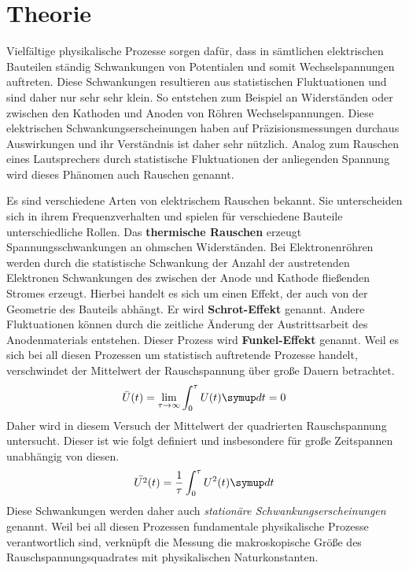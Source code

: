 \section{Theorie}
\label{sec:theorie}

Vielfältige physikalische Prozesse sorgen dafür, dass in sämtlichen elektrischen Bauteilen ständig Schwankungen von Potentialen und somit Wechselspannungen auftreten. Diese Schwankungen resultieren aus statistischen Fluktuationen und sind daher nur sehr sehr klein. So entstehen zum Beispiel an Widerständen oder zwischen den Kathoden und Anoden von Röhren Wechselspannungen. Diese elektrischen Schwankungserscheinungen haben auf Präzisionsmessungen durchaus Auswirkungen und ihr Verständnis ist daher sehr nützlich. Analog zum Rauschen eines Lautsprechers durch statistische Fluktuationen der anliegenden Spannung wird dieses Phänomen auch Rauschen genannt.

Es sind verschiedene Arten von elektrischem Rauschen bekannt. Sie unterscheiden sich in ihrem Frequenzverhalten und spielen für verschiedene Bauteile unterschiedliche Rollen. Das \textbf{thermische Rauschen} erzeugt Spannungsschwankungen an ohmschen Widerständen. Bei Elektronenröhren werden durch die statistische Schwankung der Anzahl der austretenden Elektronen Schwankungen des zwischen der Anode und Kathode fließenden Stromes erzeugt. Hierbei handelt es sich um einen Effekt, der auch von der Geometrie des Bauteils abhängt. Er wird \textbf{Schrot-Effekt} genannt. Andere Fluktuationen können durch die zeitliche Änderung der Austrittsarbeit des Anodenmaterials entstehen. Dieser Prozess wird \textbf{Funkel-Effekt} genannt. Weil es sich bei all diesen Prozessen um statistisch auftretende Prozesse handelt, verschwindet der Mittelwert der Rauschspannung über große Dauern betrachtet.
%
\begin{equation}
  \bar{U}(t)=\lim_{\tau\rightarrow\infty}\int_0^\tau U(t)\upd t=0
\end{equation}
%
Daher wird in diesem Versuch der Mittelwert der quadrierten Rauschspannung untersucht. Dieser ist wie folgt definiert und insbesondere für große Zeitspannen unabhängig von diesen.
%
\begin{equation}
  \bar{U^2}(t) =\frac{1}{\tau}\int_0^\tau U^2(t) \upd t
\end{equation}
%
Diese Schwankungen werden daher auch \textit{stationäre Schwankungserscheinungen} genannt. Weil bei all diesen Prozessen fundamentale physikalische Prozesse verantwortlich sind, verknüpft die Messung die makroskopische Größe des Rauschspannungsquadrates mit physikalischen Naturkonstanten.

